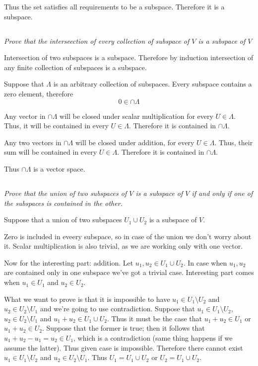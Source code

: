 \documentclass[11pt,oneside,titlepage]{book}
\begin{document}
Thus the set satisfies all requirements to be a subspace. Therefore it is a
subspace.

\subsection{}
\textit{Prove that the interseection of every collection of subspace of $V$ is
  a subspace of $V$}

Intersection of two subspaces  is a subspace. Therefore by induction
intersection of any finite collection of subspaces is a subspace.

Suppose that $\Lambda$ is an arbitrary collection of subspaces.
Every subspace contains a zero element, therefore
$$0 \in \cap \Lambda$$

Any vector in $\cap \Lambda$ will be closed under scalar multiplication
for every $U \in \Lambda$. Thus, it will be contained in every
$U \in \Lambda$. Therefore it is contained in $\cap \Lambda$.


Any two  vectors in $\cap \Lambda$ will be closed under addition,
for every $U \in \Lambda$. Thus, their sum  will be contained in every
$U \in \Lambda$. Therefore it is contained in $\cap \Lambda$.

Thus $\cap \Lambda$ is a vector space.

\subsection{}
\textit{Prove that the union of two subspaces of $V$ is a subspace of $V$
  if and only if one of the subspaces is contained in the other.}

Suppose that a union of two subspaces $U_1 \cup U_2$
is a subspace of $V$.

Zero is included in eveery subspace, so in case of the union we don't worry
about it.
Scalar multiplication is also trivial, as we are working only with one vector.

Now for the interesting part: addition. Let $u_1, u_2 \in U_1 \cup U_2$.
In case when $u_1, u_2$ are contained only in one subspace we've got
a trivial case. Interesting part comes when $u_1 \in U_1$ and $u_2 \in U_2$.

What we want to prove is that it is impossible to have
$u_1 \in U_1 \setminus U_2$ and $u_2 \in U_2 \setminus U_1$ and we're going to
use contradiction. Suppose that
$u_1 \in U_1 \setminus U_2$, $u_2 \in U_2 \setminus U_1$ and
$u_1 + u_2 \in U_1 \cup U_2$. Thus it must be the case that
$u_1 + u_2 \in U_1$ or $u_1 + u_2 \in U_2$. Suppose that the former is true;
then it follows that $u_1 + u_2 - u_1 = u_2 \in U_1$, which is a contradiction
(same thing happens if we assume the latter). Thus given case is impossible.
Therefore there cannot exist $u_1 \in U_1 \setminus U_2$ and
$u_2 \in U_2 \setminus U_1$. Thus
$U_1 = U_1 \cup U_2$ or $U_2 = U_1 \cup U_2$.
\end{document}
